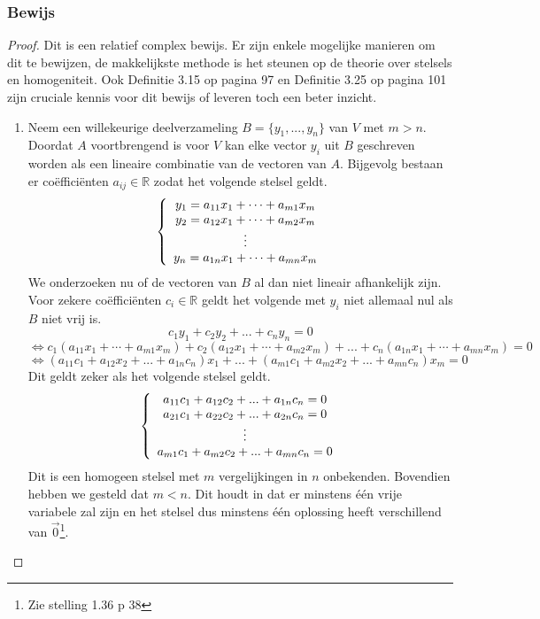 \documentclass[lineaire_algebra_oplossingen.tex]{subfiles}
\begin{document}
\subsubsection*{Bewijs}
\begin{proof}
Dit is een relatief complex bewijs. Er zijn enkele mogelijke manieren om dit te bewijzen, de makkelijkste methode is het steunen op de theorie over stelsels en homogeniteit. Ook Definitie 3.15 op pagina 97 en Definitie 3.25 op pagina 101 zijn cruciale kennis voor dit bewijs of leveren toch een beter inzicht.\\
\begin{enumerate}
\item
Neem een willekeurige deelverzameling $B = \{y_1,...,y_n\}$ van $V$ met $m > n$.\\
Doordat $A$ voortbrengend is voor $V$ kan elke vector $y_i$ uit $B$ geschreven worden als een lineaire combinatie van de vectoren van $A$. Bijgevolg bestaan er co\"effici\"enten $a_{ij}\in \mathbb{R}$ zodat het volgende stelsel geldt.
\[
\left\lbrace
\begin{array}{c c}
y_1 = a_{11}x_1 + \cdots + a_{m1}x_m\\
y_2 = a_{12}x_1 + \cdots + a_{m2}x_m\\
\vdots\\
y_n = a_{1n}x_1 + \cdots + a_{mn}x_m\\
\end{array}
\right.
\]
We onderzoeken nu of de vectoren van $B$ al dan niet lineair afhankelijk zijn. Voor zekere co\"effici\"enten $c_i\in \mathbb{R}$ geldt het volgende met $y_i$ niet allemaal nul als $B$ niet vrij is.
\[
c_1y_1 + c_2y_2 + ... + c_ny_n = 0
\]
\[
\Leftrightarrow
c_1(a_{11}x_1 + \cdots + a_{m1}x_m) + c_2(a_{12}x_1 + \cdots + a_{m2}x_m) + ... + c_n(a_{1n}x_1 + \cdots + a_{mn}x_m) = 0
\]
\[
\Leftrightarrow
(a_{11}c_1+a_{12}x_2+...+a_{1n}c_n)x_1 + ... + (a_{m1}c_1+a_{m2}x_2+...+a_{mn}c_n)x_m = 0
\]
Dit geldt zeker als het volgende stelsel geldt.
\[
\left\{
\begin{array}{c c}
a_{11}c_1+a_{12}c_2+...+a_{1n}c_n = 0\\
a_{21}c_1+a_{22}c_2+...+a_{2n}c_n = 0\\
\vdots\\
a_{m1}c_1+a_{m2}c_2+...+a_{mn}c_n = 0\\
\end{array}
\right.
\]
Dit is een homogeen stelsel met $m$ vergelijkingen in $n$ onbekenden. Bovendien hebben we gesteld dat $m<n$. Dit houdt in dat er minstens \'e\'en vrije variabele zal zijn en het stelsel dus minstens \'e\'en oplossing heeft verschillend van $\vec{0}$\footnote{Zie stelling 1.36 p 38}.

\end{enumerate}
\end{proof}
\end{document}
